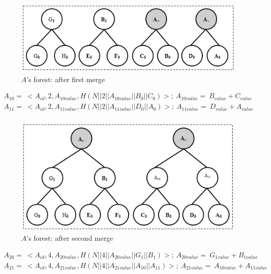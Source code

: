 \documentclass[%
  slidesonly,%
  semlayer%
  ]{seminar}                                  %
\begin{document}
\begin{slide}
      \begin{figure}[h!]
        \centering
        \includegraphics[scale = 0.5]{images/a-forest-first-merge.png}
        \caption{$A$'s forest: after first merge}
        \label{fig:a-forest-first-merge}
      \end{figure}
      \begin{equation*}
        \begin{array}{l}
          A_{10} =\ <A_{id},2,A_{10value},H(N||2||A_{10value}||B_{0}||C_{0})>;\ A_{10value} =\ B_{value} + C_{value}\\
          A_{11} =\ <A_{id},2,A_{11value},H(N||2||A_{11value}||D_{0}||A_{0})>;\ A_{11value} =\ D_{value} + A_{value}\\
        \end{array}     
      \end{equation*}

      \begin{figure}[h!]
        \centering
        \includegraphics[scale = 0.5]{images/a-forest-second-merge.png}
        \caption{$A$'s forest: after second merge}
        \label{fig:a-forest-second-merge}
      \end{figure}

      \begin{equation*}
        \begin{array}{l}
          A_{20} =\ <A_{id},4,A_{20value},H(N||4||A_{20value}||G_{1}||B_{1})>;\ A_{20value} =\ G_{1value} + B_{1value}\\ 
          A_{21} =\ <A_{id},4,A_{21value},H(N||4||A_{21value}||A_{10}||A_{11})>;\ A_{21value} =\ A_{10value} + A_{11value}\\ 
        \end{array}
      \end{equation*}


\end{slide}
\end{document}
